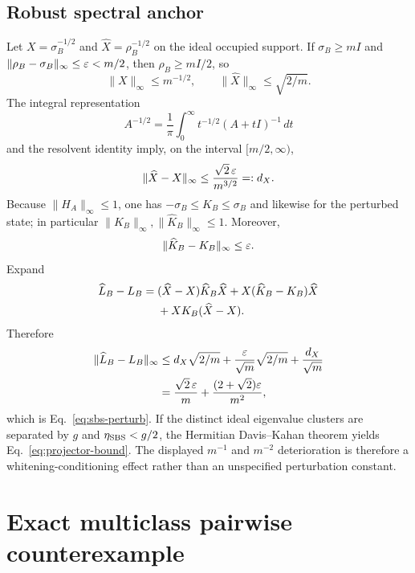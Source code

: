 \subsection{Robust spectral anchor}
Let $X=\sigma_B^{-1/2}$ and $\widehat X=\rho_B^{-1/2}$ on the ideal occupied support. If $\sigma_B\ge mI$ and $\|\rho_B-\sigma_B\|_\infty\le\varepsilon<m/2$, then $\rho_B\ge mI/2$, so
\begin{equation}
\|X\|_\infty\le m^{-1/2},
\qquad
\|\widehat X\|_\infty\le\sqrt{2/m}.
\end{equation}
The integral representation
\begin{equation}
A^{-1/2}=\frac1\pi\int_0^\infty t^{-1/2}(A+tI)^{-1}\,dt
\end{equation}
and the resolvent identity imply, on the interval $[m/2,\infty)$,
\begin{equation}
\|\widehat X-X\|_\infty
\le\frac{\sqrt2\,\varepsilon}{m^{3/2}}
=:d_X.
\end{equation}
Because $\|H_A\|_\infty\le1$, one has $-\sigma_B\le K_B\le\sigma_B$ and likewise for the perturbed state; in particular $\|K_B\|_\infty,\|\widehat K_B\|_\infty\le1$. Moreover,
\begin{equation}
\|\widehat K_B-K_B\|_\infty\le\varepsilon.
\end{equation}
Expand
\begin{align}
\widehat L_B-L_B
={}&(\widehat X-X)\widehat K_B\widehat X
+X(\widehat K_B-K_B)\widehat X\notag\\
&+XK_B(\widehat X-X).
\end{align}
Therefore
\begin{align}
\|\widehat L_B-L_B\|_\infty
&\le d_X\sqrt{2/m}
+\frac{\varepsilon}{\sqrt m}\sqrt{2/m}
+\frac{d_X}{\sqrt m}\notag\\
&=\frac{\sqrt2\,\varepsilon}{m}
+\frac{(2+\sqrt2)\varepsilon}{m^2},
\end{align}
which is Eq.~\eqref{eq:sbs-perturb}. If the distinct ideal eigenvalue clusters are separated by $g$ and $\eta_{\rm SBS}<g/2$, the Hermitian Davis--Kahan theorem yields Eq.~\eqref{eq:projector-bound}. The displayed $m^{-1}$ and $m^{-2}$ deterioration is therefore a whitening-conditioning effect rather than an unspecified perturbation constant.

\section{Exact multiclass pairwise counterexample}
\label{app:counterexample}

